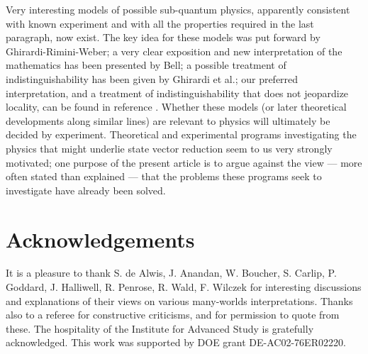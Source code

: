 \documentclass[aps,pra,12pt]{revtex4}
\begin{document}
Very interesting models of possible 
sub-quantum physics, apparently consistent with known experiment and
with all the properties required in
the last paragraph, now exist.  The key idea for these models was put
forward by Ghirardi-Rimini-Weber;\cite{grw} a very clear exposition and
new interpretation of the mathematics has been presented by Bell;\cite{bell3}
a possible treatment of indistinguishability 
has been given by Ghirardi et al.;\cite{gnrw} 
our preferred interpretation, and a treatment of indistinguishability that
does not jeopardize locality, can be found in reference \cite{ak}. 
Whether these models (or later theoretical developments along similar
lines) are relevant to physics will ultimately be decided by
experiment. 
Theoretical and experimental programs investigating
the physics that might underlie state vector reduction seem to us very strongly
motivated; one purpose of the present article is to argue against
the view --- more often stated than explained --- 
that the problems these programs seek to investigate have already
been solved.  

\section{Acknowledgements}

It is a pleasure to thank S. de Alwis, J. Anandan, W. Boucher, S. Carlip, 
P. Goddard, J. Halliwell, R. Penrose, R. Wald, F. Wilczek 
for interesting discussions and explanations of their views on various
many-worlds interpretations.
Thanks also to a referee for constructive criticisms, and for
permission to quote from these. 
The hospitality of the Institute for Advanced Study is gratefully 
acknowledged. This work was supported by DOE grant DE-AC02-76ER02220. 
\end{document}

